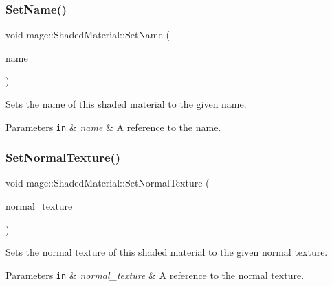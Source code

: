 \subsubsection{\texorpdfstring{Set\+Name()}{SetName()}\hspace{0.1cm}{\footnotesize\ttfamily [2/2]}}
{\footnotesize\ttfamily void mage\+::\+Shaded\+Material\+::\+Set\+Name (\begin{DoxyParamCaption}\item[{string \&\&}]{name }\end{DoxyParamCaption})}

Sets the name of this shaded material to the given name.


\begin{DoxyParams}[1]{Parameters}
\mbox{\tt in}  & {\em name} & A reference to the name. \\
\hline
\end{DoxyParams}
\hypertarget{structmage_1_1_shaded_material_a681531e5a979ebdc4a0e8933a2439c0f}{}\label{structmage_1_1_shaded_material_a681531e5a979ebdc4a0e8933a2439c0f} 
\subsubsection{\texorpdfstring{Set\+Normal\+Texture()}{SetNormalTexture()}}
{\footnotesize\ttfamily void mage\+::\+Shaded\+Material\+::\+Set\+Normal\+Texture (\begin{DoxyParamCaption}\item[{\hyperlink{namespacemage_a1e01ae66713838a7a67d30e44c67703e}{Shared\+Ptr}$<$ \hyperlink{classmage_1_1_texture}{Texture} $>$}]{normal\+\_\+texture }\end{DoxyParamCaption})}

Sets the normal texture of this shaded material to the given normal texture.


\begin{DoxyParams}[1]{Parameters}
\mbox{\tt in}  & {\em normal\+\_\+texture} & A reference to the normal texture. \\
\hline
\end{DoxyParams}
\hypertarget{structmage_1_1_shaded_material_a65646872fce0961e7ac346be162e89ec}{}\label{structmage_1_1_shaded_material_a65646872fce0961e7ac346be162e89ec} 
